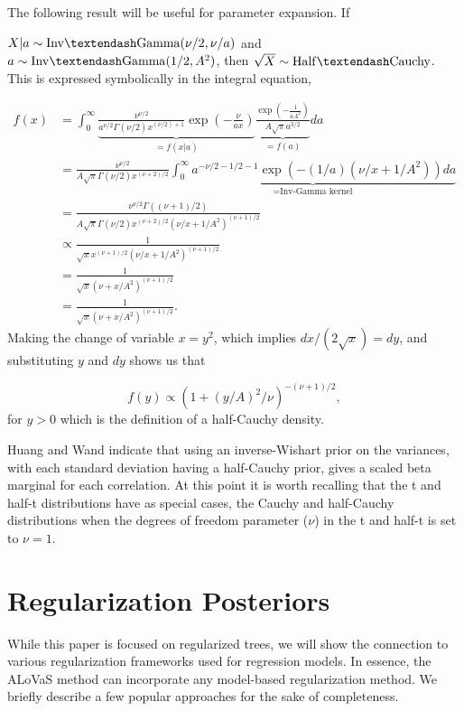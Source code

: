 The following result will be useful for parameter expansion. If 

$X\vert a \sim \mathrm{Inv\textendash Gamma}(\nu/2, \nu/a)$ and  $a \sim \mathrm{Inv\textendash Gamma}(1/2,A^2)$, then $\sqrt{X}\sim \mathrm{Half\textendash Cauchy}$. This is expressed symbolically in the integral equation,

\begin{align*}
f(x) &= \int_0^\infty \underbrace{  \frac{\nu^{\nu/2}}{a^{\nu/2}\Gamma(\nu/2)x^{(\nu/2)+1}}\exp{(-\frac{\nu}{ax})}   }_{=f(x\vert a)} \underbrace{\frac{\exp{(-\frac{1}{aA^2})}}{A\sqrt{\pi}a^{3/2}}}_{=f(a)} da\\
&=\frac{\nu^{\nu/2}}{A\sqrt{\pi}\Gamma(\nu/2)x^{(\nu+2)/2}}\underbrace{\int_0^\infty a^{-\nu/2-1/2-1}\exp{(-(1/a)(\nu/x+1/A^2))}da}_{=\text{Inv-Gamma kernel}}\\
&=\frac{\nu^{\nu/2}\Gamma((\nu+1)/2)}{A\sqrt{\pi}\Gamma(\nu/2)x^{(\nu+2)/2}(\nu/x+1/A^2)^{(\nu+1)/2}}\\
&\propto \frac{1}{\sqrt{x}x^{(\nu+1)/2}(\nu/x+1/A^2)^{(\nu+1)/2}}\\
& =\frac{1}{\sqrt{x}(\nu+x/A^2)^{(\nu+1)/2}  }\\
&=\frac{1}{\sqrt{x}(\nu+x/A^2)^{(\nu+1)/2}  }.
\end{align*}
Making the change of variable $x=y^2$, which implies $dx/(2\sqrt{x})=dy$, and substituting $y$ and $dy$ shows us that 

\begin{equation}
f(y) \propto (1+(y/A)^2/\nu)^{-(\nu+1)/2},
\end{equation}
for $y>0$ which is the definition of a half-Cauchy density. 

Huang and Wand \cite{huang2013simple} indicate that using an inverse-Wishart prior on the variances, with each standard deviation having a half-Cauchy prior, gives a scaled beta marginal for each correlation. At this point it is worth recalling that the t and half-t distributions have as special cases, the Cauchy and half-Cauchy distributions when the degrees of freedom parameter ($\nu$) in the t and half-t is set to $\nu=1$. 


\section{Regularization Posteriors}\label{subsec:Regularization Priors}
		While this paper is focused on regularized trees, we will show the connection to various regularization frameworks used for regression models. In essence, the ALoVaS method can incorporate any model-based regularization method. We briefly describe a few popular approaches for the sake of completeness. 
		
